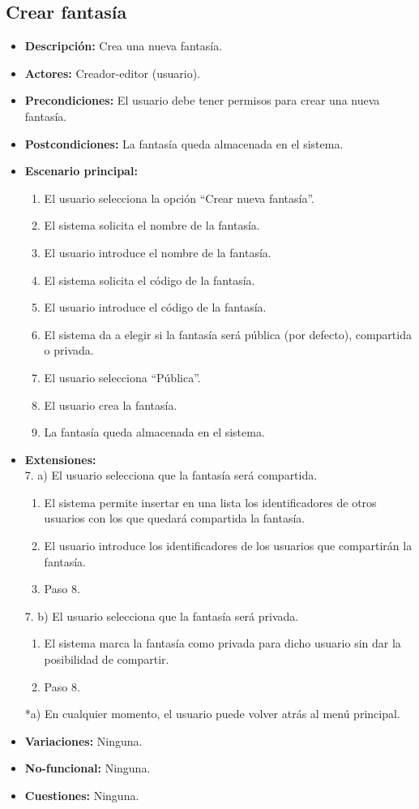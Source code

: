 \subsection{Crear fantasía}
\begin{itemize}
	\item \textbf{Descripción:} Crea una nueva fantasía.
	\item \textbf{Actores:} Creador-editor (usuario).
	\item \textbf{Precondiciones:} El usuario debe tener permisos para crear una nueva fantasía.
	\item \textbf{Postcondiciones:} La fantasía queda almacenada en el sistema.
	\item \textbf{Escenario principal:}
	\begin{enumerate}
		\item El usuario selecciona la opción ``Crear nueva fantasía''.
		\item El sistema solicita el nombre de la fantasía.
		\item El usuario introduce el nombre de la fantasía.
		\item El sistema solicita el código de la fantasía.
		\item El usuario introduce el código de la fantasía.
		\item El sistema da a elegir si la fantasía será pública (por defecto), compartida o privada.
		\item El usuario selecciona ``Pública''.
		\item El usuario crea la fantasía.
		\item La fantasía queda almacenada en el sistema.
	\end{enumerate}
	\item \textbf{Extensiones:} \\7. a) El usuario selecciona que la fantasía será compartida.
	\begin{enumerate}
		\item El sistema permite insertar en una lista los identificadores de otros usuarios con los que quedará compartida la fantasía.
		\item El usuario introduce los identificadores de los usuarios que compartirán la fantasía.
		\item Paso 8.
	\end{enumerate}
	7. b) El usuario selecciona que la fantasía será privada.
	\begin{enumerate}
		\item El sistema marca la fantasía como privada para dicho usuario sin dar la posibilidad de compartir.
		\item Paso 8.
	\end{enumerate}
	*a) En cualquier momento, el usuario puede volver atrás al menú principal.
	\item \textbf{Variaciones:} Ninguna.
	\item \textbf{No-funcional:} Ninguna.
	\item \textbf{Cuestiones:} Ninguna.
\end{itemize}

